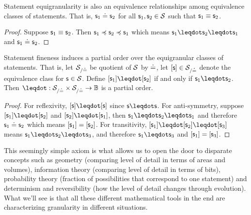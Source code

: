 \documentclass[11pt,letterpaper,fleqn]{memoir} %
\begin{document}
\begin{mathSection}
\begin{coro}
	Statement equigranularity is also an equivalence relationships among equivalence classes of statements. That is, $\mathsf{s}_1 \doteq \mathsf{s}_2$ for all $\mathsf{s}_1,\mathsf{s}_2 \in \mathcal{S}$ such that $\mathsf{s}_1 \equiv \mathsf{s}_2$.
\end{coro}
\begin{proof}
	Suppose $\mathsf{s}_1 \equiv \mathsf{s}_2$. Then $\mathsf{s}_1 \preccurlyeq \mathsf{s}_2 \preccurlyeq \mathsf{s}_1$ which means $\stmt_1 \finer \stmt_2 \finer \stmt_1$ and $\mathsf{s}_1 \doteq \mathsf{s}_2$.
\end{proof}

\begin{coro}
	Statement fineness induces a partial order over the equigranular classes of statements. That is, let $\mathcal{S}_{/\doteq}$ be quotient of $\mathcal{S}$ by $\doteq$, let $[\mathsf{s}] \in \mathcal{S}_{/\doteq}$ denote the equivalence class for $\mathsf{s} \in \mathcal{S}$. Define $[\stmt_1] \finer [\stmt_2]$ if and only if $\stmt_1 \finer \stmt_2$. Then $\finer : \logCtx_{/\eqgran} \times \logCtx_{/\eqgran} \to \Bool$ is a partial order.
\end{coro}
\begin{proof}
	For reflexivity, $[\stmt] \finer [\stmt]$ since $\stmt \finer \stmt$. For anti-symmetry, suppose $[\stmt_1] \finer [\stmt_2]$ and $[\stmt_2] \finer [\stmt_1]$, then $\stmt_1 \finer \stmt_2 \finer \stmt_1$ and therefore $\mathsf{s}_1 \doteq \mathsf{s}_2$ which means $[\mathsf{s}_1] = [\mathsf{s}_2]$. For transitivity, $[\stmt_1] \finer [\stmt_2] \finer [\stmt_3]$ means $\stmt_1 \finer \stmt_2 \finer \stmt_3$, and therefore $\stmt_1 \finer \stmt_3$ and $[\mathsf{s}_1] = [\mathsf{s}_3]$.
\end{proof}

\end{mathSection}

This seemingly simple axiom is what allows us to open the door to disparate concepts such as geometry (comparing level of detail in terms of areas and volumes), information theory (comparing level of detail in terms of bits), probability theory (fraction of possibilities that correspond to one statement) and determinism and reversibility (how the level of detail changes through evolution). What we'll see is that all these different mathematical tools in the end are characterizing granularity in different situations.
\end{document}
